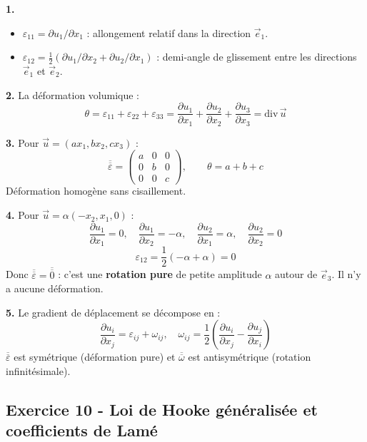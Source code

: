 \documentclass[12pt,a4paper]{article}
\begin{document}
\begin{boitecorrige}
\textbf{1.}
\begin{itemize}
  \item $\varepsilon_{11} = \partial u_1/\partial x_1$ : allongement relatif dans la direction $\vec{e}_1$.
  \item $\varepsilon_{12} = \frac{1}{2}(\partial u_1/\partial x_2 + \partial u_2/\partial x_1)$ : demi-angle de glissement entre les directions $\vec{e}_1$ et $\vec{e}_2$.
\end{itemize}

\textbf{2.} La déformation volumique :
\[
\theta = \varepsilon_{11}+\varepsilon_{22}+\varepsilon_{33} = \frac{\partial u_1}{\partial x_1}+\frac{\partial u_2}{\partial x_2}+\frac{\partial u_3}{\partial x_3} = \text{div}\,\vec{u}
\]

\textbf{3.} Pour $\vec{u} = (ax_1, bx_2, cx_3)$ :
\[
\overline{\overline{\varepsilon}} = \begin{pmatrix}a&0&0\\0&b&0\\0&0&c\end{pmatrix}, \qquad\theta = a+b+c
\]
Déformation homogène sans cisaillement.

\textbf{4.} Pour $\vec{u} = \alpha(-x_2, x_1, 0)$ :
\[
\frac{\partial u_1}{\partial x_1}=0,\quad\frac{\partial u_1}{\partial x_2}=-\alpha,\quad\frac{\partial u_2}{\partial x_1}=\alpha,\quad\frac{\partial u_2}{\partial x_2}=0
\]
\[
\varepsilon_{12} = \frac{1}{2}(-\alpha+\alpha) = 0
\]
Donc $\overline{\overline{\varepsilon}} = \overline{\overline{0}}$ : c'est une \textbf{rotation pure} de petite amplitude $\alpha$ autour de $\vec{e}_3$. Il n'y a aucune déformation.

\textbf{5.} Le gradient de déplacement se décompose en :
\[
\frac{\partial u_i}{\partial x_j} = \varepsilon_{ij} + \omega_{ij}, \quad\omega_{ij} = \frac{1}{2}\left(\frac{\partial u_i}{\partial x_j}-\frac{\partial u_j}{\partial x_i}\right)
\]
$\overline{\overline{\varepsilon}}$ est symétrique (déformation pure) et $\overline{\overline{\omega}}$ est antisymétrique (rotation infinitésimale).
\end{boitecorrige}

\subsection*{Exercice 10 - Loi de Hooke généralisée et coefficients de Lamé \niveau{\moyen}}
\end{document}
